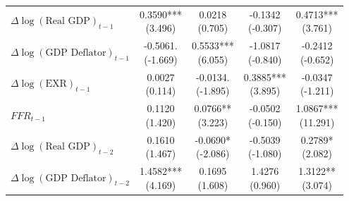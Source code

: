 \documentclass[12pt]{article}
\begin{document}
\begin{enumerate}[label=\arabic*.]
\begin{table}[htbp]
\begin{tabular}{lcccc}
        $\Delta\log(\text{Real GDP})_{t-1}$
        & \makecell{0.3590***\\(3.496)}
        & \makecell{0.0218\\(0.705)}
        & \makecell{-0.1342\\(-0.307)}
        & \makecell{0.4713***\\(3.761)} \\
        
        $\Delta\log(\text{GDP Deflator})_{t-1}$
        & \makecell{-0.5061.\\(-1.669)}
        & \makecell{0.5533***\\(6.055)}
        & \makecell{-1.0817\\(-0.840)}
        & \makecell{-0.2412\\(-0.652)} \\
        
        $\Delta\log(\text{EXR})_{t-1}$
        & \makecell{0.0027\\(0.114)}
        & \makecell{-0.0134.\\(-1.895)}
        & \makecell{0.3885***\\(3.895)}
        & \makecell{-0.0347\\(-1.211)} \\
        
        $FFR_{t-1}$
        & \makecell{0.1120\\(1.420)}
        & \makecell{0.0766**\\(3.223)}
        & \makecell{-0.0502\\(-0.150)}
        & \makecell{1.0867***\\(11.291)} \\
        
        $\Delta\log(\text{Real GDP})_{t-2}$
        & \makecell{0.1610\\(1.467)}
        & \makecell{-0.0690*\\(-2.086)}
        & \makecell{-0.5039\\(-1.080)}
        & \makecell{0.2789*\\(2.082)} \\
        
        $\Delta\log(\text{GDP Deflator})_{t-2}$
        & \makecell{1.4582***\\(4.169)}
        & \makecell{0.1695\\(1.608)}
        & \makecell{1.4276\\(0.960)}
        & \makecell{1.3122**\\(3.074)} \\
        

\end{tabular}
\end{table}
\end{enumerate}
\end{document}
